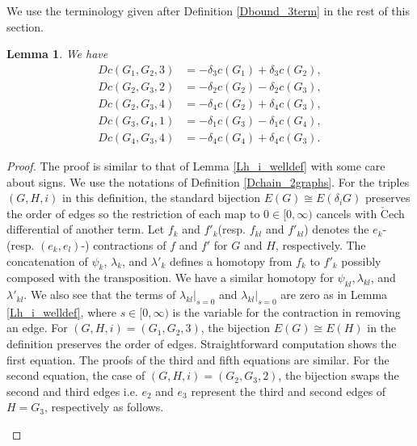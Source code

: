 \documentclass[reqno]{amsart}
\theoremstyle{definition}
\theoremstyle{plain}
\newtheorem{lem}[defi]{Lemma}
\begin{document}
We use the terminology given after Definition \ref{Dbound_3term} in the rest of this section.
\begin{lem}\label{Lbound_ch3}
We have 
\[
\begin{split}
Dc(G_1,G_2,3)& =-\delta_3c(G_1)+\delta_3c(G_2), \\
Dc(G_2,G_3,2)&=-\delta_2c(G_2)-\delta_2c(G_3), \\
Dc(G_2,G_3,4)&=-\delta_4c(G_2)+\delta_4c(G_3), \\
Dc(G_3,G_4,1)&=-\delta_1c(G_3)-\delta_1c(G_4), \\
Dc(G_4,G_3,4)&=-\delta_4c(G_4)+\delta_4c(G_3).
\end{split}
\]


\end{lem}
\begin{proof}
The proof is similar to that of Lemma \ref{Lh_i_welldef} with some care about signs. We use the notations of Definition \ref{Dchain_2graphs}. For the triples $(G,H,i)$ in this definition,  the standard bijection $E(G)\cong E(\delta_iG)$ preserves the order of edges so the restriction of each map to $0\in [0,\infty)$ cancels with $\check{\text{C}}$ech differential of another term. Let $f_k$ and $f'_k$(resp.  $f_{kl}$ and $f'_{kl}$) denotes the $e_k$-(resp. $(e_k,e_l)$-) contractions of $f$ and $f'$ for $G$ and $H$, respectively. The concatenation of $\psi_k$, $\lambda_k$, and $\lambda'_k$ defines a homotopy from $f_k$ to $f'_k$ possibly composed with the transposition. We have a similar homotopy for $\psi_{kl}, \lambda_{kl}$, and $\lambda'_{kl}$. We also see that the terms of $\lambda_{kl}|_{s=0}$ and $\lambda_{kl}|_{s=0}$ are zero as in Lemma \ref{Lh_i_welldef}, where $s\in [0,\infty)$ is the variable for the contraction in removing an edge. For $(G,H,i)=(G_1,G_2,3)$, the bijection $E(G)\cong E(H)$ in the definition  preserves the order of edges.  Straightforward computation shows the first equation. The proofs of the  third and fifth equations are similar. For the second equation, the case of $(G,H,i)=(G_2,G_3,2)$, the bijection swaps the second and third edges i.e. $e_2$ and $e_3$ represent the third and second edges  of $H=G_3$, respectively as follows.
\begin{figure}[H]
\begin{center}
\phantom{aaaaaaaaaaaaaa}
\end{center}
\vspace{-7.2cm}\caption{}\label{Falternate}

\end{figure}
\end{proof}
\end{document}
